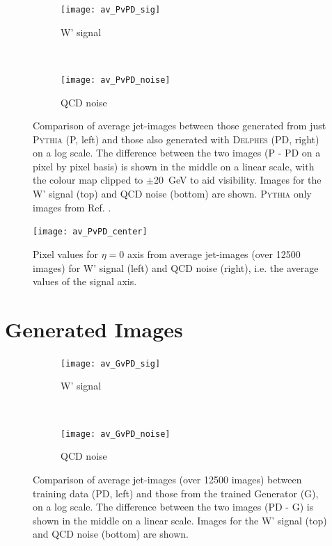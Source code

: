 \documentclass{report}
\newcommand{\pkg}[1]{\textsc{#1}}
\begin{document}
\begin{figure}[H]
	\centering
	\begin{subfigure}[t]{1.0\linewidth}
		\centering
		\texttt{[image: av\_PvPD\_sig]}
		\caption{W' signal}
	\end{subfigure}%
	\\
	\begin{subfigure}[t]{1.0\linewidth}
		\centering
		\texttt{[image: av\_PvPD\_noise]}
		\caption{QCD noise}
	\end{subfigure}

	\caption{Comparison of average jet-images between those generated from just \pkg{Pythia} (P, left) and those also generated with \pkg{Delphes} (PD, right) on a log scale. The difference between the two images (P - PD on a pixel by pixel basis) is shown in the middle on a linear scale, with the colour map clipped to $\pm$\SI{20}{\giga\electronvolt} to aid visibility. Images for the W' signal (top) and QCD noise (bottom) are shown. \pkg{Pythia} only images from Ref. \cite{de2017learning}. }
	\label{fig:delphes_ims}
\end{figure}

\begin{figure}[H]
	\centering
	\texttt{[image: av\_PvPD\_center]}
	
	\caption{Pixel values for $\eta=0$ axis from average jet-images (over \num{12500} images)  for W' signal (left) and QCD noise (right), i.e. the average values of the signal axis.}
	\label{fig:delphes_middle}
	
\end{figure} 

\section{Generated Images}

\begin{figure}[H]
	\centering
	\begin{subfigure}[t]{1.0\linewidth}
		\centering
		\texttt{[image: av\_GvPD\_sig]}
		\caption{W' signal}
	\end{subfigure}%
	\\
	\begin{subfigure}[t]{1.0\linewidth}
		\centering
		\texttt{[image: av\_GvPD\_noise]}
		\caption{QCD noise}
	\end{subfigure}
	
	\caption{Comparison of average jet-images (over \num{12500} images) between training data (PD, left) and those from the trained Generator (G), on a log scale. The difference between the two images (PD - G) is shown in the middle on a linear scale. Images for the W' signal (top) and QCD noise (bottom) are shown.}
	\label{fig:pdvg}
\end{figure}
\end{document}

